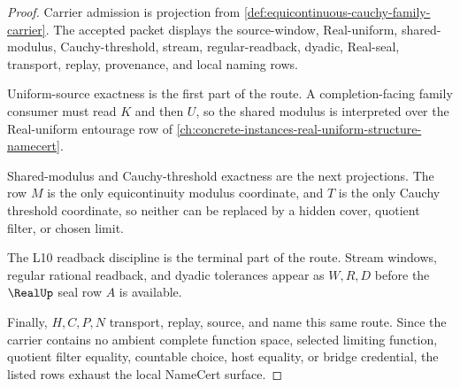 \begin{proof}
Carrier admission is projection from \autoref{def:equicontinuous-cauchy-family-carrier}. The accepted packet displays the source-window, Real-uniform, shared-modulus, Cauchy-threshold, stream, regular-readback, dyadic, Real-seal, transport, replay, provenance, and local naming rows.

Uniform-source exactness is the first part of the route. A completion-facing family consumer must read $K$ and then $U$, so the shared modulus is interpreted over the Real-uniform entourage row of \autoref{ch:concrete-instances-real-uniform-structure-namecert}.

Shared-modulus and Cauchy-threshold exactness are the next projections. The row $M$ is the only equicontinuity modulus coordinate, and $T$ is the only Cauchy threshold coordinate, so neither can be replaced by a hidden cover, quotient filter, or chosen limit.

The L10 readback discipline is the terminal part of the route. Stream windows, regular rational readback, and dyadic tolerances appear as $W,R,D$ before the $\RealUp$ seal row $A$ is available.

Finally, $H,C,P,N$ transport, replay, source, and name this same route. Since the carrier contains no ambient complete function space, selected limiting function, quotient filter equality, countable choice, host equality, or bridge credential, the listed rows exhaust the local NameCert surface.
\end{proof}

